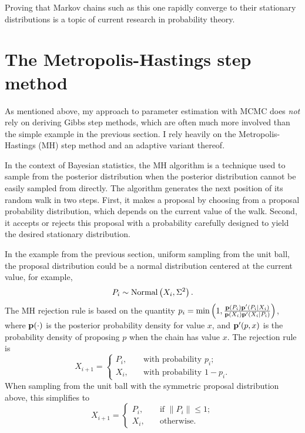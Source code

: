 Proving that Markov chains such as this one rapidly converge to their stationary
distributions is a topic of current research in probability theory.

\section{The Metropolis-Hastings step method}
As mentioned above, my approach to parameter estimation with MCMC does
\emph{not} rely on deriving Gibbs step methods, which are often much
more involved than the simple example in the previous section.  I rely
heavily on the Metropolis-Hastings (MH) step method and an adaptive
variant thereof.\cite{metropolis_equation_1953,hastings_monte_1970,chib_understanding_1995}

In the context of Bayesian statistics, the MH
algorithm is a technique used to sample from the posterior
distribution when the posterior distribution cannot be easily sampled
from directly. The algorithm generates the next position of its random walk
in two steps.  First, it makes a proposal by choosing from a proposal
probability distribution, which depends on the current value of the
walk. Second, it accepts or rejects this proposal with a probability
carefully designed to yield the desired stationary distribution.

In the example from the previous section, uniform sampling from the
unit ball, the proposal distribution could be a normal distribution
centered at the current value, for example,
\[
P_i \sim \operatorname{Normal}\left(X_i, \Sigma^2\right).
\]
The MH rejection rule is based on the quantity $p_i =
\min\left(1, \frac{\mathbf{p}(P_i)\mathbf{p}'(P_i|X_i)}{\mathbf{p}(X_i)\mathbf{p}'(X_i|P_i)}\right)$, where
$\mathbf{p}(\cdot)$ is the posterior probability density for value $x$, and
$\mathbf{p}'(p, x)$ is the probability density of proposing $p$ when the
chain has value $x$.  The rejection rule is
\[
X_{i+1} = \begin{cases}
P_i, &\quad\text{with probability } p_i;\\
X_i, &\quad\text{with probability } 1-p_i.
\end{cases}
\]
When sampling from the unit ball with the
symmetric proposal distribution above, this simplifies to
\[
X_{i+1} = \begin{cases}
P_i , &\quad\text{if }\|P_i\| \leq 1;\\
X_i, &\quad\text{otherwise}.
\end{cases}
\]

